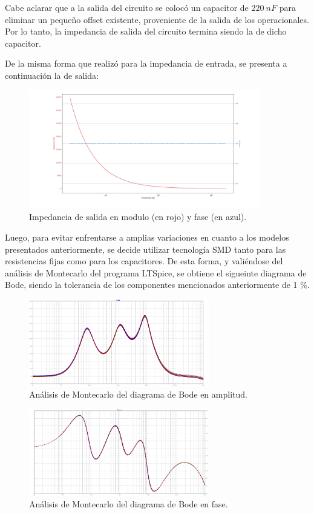 Cabe aclarar que a la salida del circuito se colocó un capacitor de $220 \ nF$ para eliminar un pequeño offset existente, proveniente de la salida de los operacionales. Por lo tanto, la impedancia de salida del circuito termina siendo la de dicho capacitor.

De la misma forma que realizó para la impedancia de entrada, se presenta a continuación la de salida:
\begin{figure}[H]
\centering
	\includegraphics[width=0.9\textwidth]{Imagenes/Zout.png}
	\caption{Impedancia de salida en modulo (en rojo) y fase (en azul).}
	\label{fig:zout}
\end{figure}

Luego, para evitar enfrentarse a amplias variaciones en cuanto a los modelos presentados anteriormente, se decide utilizar tecnología SMD tanto para las resistencias fijas como para los capacitores. De esta forma, y valiéndose del análisis de Montecarlo del programa LTSpice, se obtiene el sigueinte diagrama de Bode, siendo la tolerancia de los componentes mencionados anteriormente de 1 \%.

\begin{figure}[H]	
	\centering
	\includegraphics[width=0.7\textwidth]{Imagenes/MC-Mod.png}
	\caption{Análisis de Montecarlo del diagrama de Bode en amplitud.}
	\label{fig:MC-Mod}
\end{figure}

\begin{figure}[H]	
	\centering
	\includegraphics[width=0.7\textwidth]{Imagenes/MC-Ph.png}
	\caption{Análisis de Montecarlo del diagrama de Bode en fase.}
	\label{fig:MC-Ph}
\end{figure}

